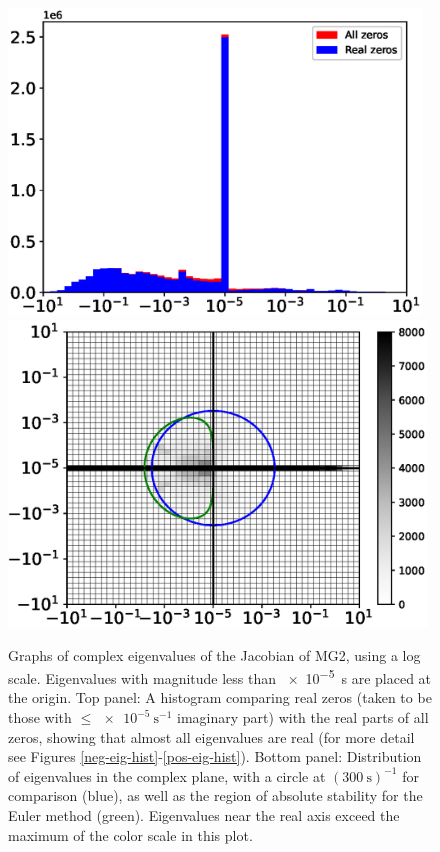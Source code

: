 \documentclass [11pt, proquest] {uwthesis}[2020/02/24]
\begin{document}
\begin{figure}[htbp]
  \begin{center}
  \includegraphics[height=3.2in]{complex_vertint_cutoff.eps}
  \includegraphics[height=3.2in]{complex_eigenvalues.eps}
  \end{center}
  \caption[Graphs of complex eigenvalues of the Jacobian of MG2]{Graphs of complex eigenvalues of the Jacobian of MG2, using a log scale. Eigenvalues with magnitude less than \SI{e-5}{\second} are placed at the origin. Top panel: A histogram comparing real zeros (taken to be those with $\le \SI{e-5}{\second^{-1}}$ imaginary part) with the real parts of all zeros, showing that almost all eigenvalues are real (for more detail see Figures \ref{neg-eig-hist}-\ref{pos-eig-hist}). Bottom panel: Distribution of eigenvalues in the complex plane, with a circle at $(\SI{300}{\second})^{-1}$ for comparison (blue), as well as the region of absolute stability for the Euler method (green). Eigenvalues near the real axis exceed the maximum of the color scale in this plot.}
  \label{complex-eigs}
\end{figure}
\end{document}
